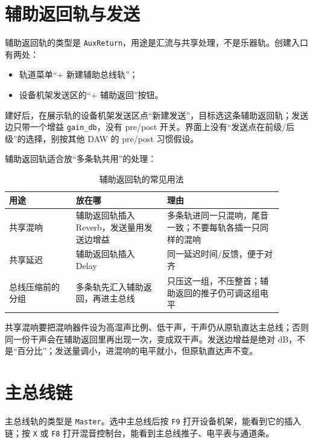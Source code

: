 \section{辅助返回轨与发送}

辅助返回轨的类型是 \texttt{AuxReturn}，用途是汇流与共享处理，不是乐器轨。创建入口有两处：

\begin{itemize}
  \item 轨道菜单“+ 新建辅助总线轨”；
  \item 设备机架发送区的“+ 辅助返回”按钮。
\end{itemize}

建好后，在展示轨的设备机架发送区点“新建发送”，目标选这条辅助返回轨；发送边只带一个增益 \texttt{gain\_db}，没有 pre/post 开关。界面上没有“发送点在前级/后级”的选择，别按其他 DAW 的 pre/post 习惯假设。


辅助返回轨适合放“多条轨共用”的处理：

\begin{table}[htbp]
\centering
\small
\begin{tabular}{@{}p{0.22\linewidth}p{0.30\linewidth}p{0.38\linewidth}@{}}
\hline
用途 & 放在哪 & 理由 \\
\hline
共享混响 & 辅助返回轨插入 Reverb，发送量用发送边增益 & 多条轨进同一只混响，尾音一致；不要每轨各插一只同样的混响 \\
共享延迟 & 辅助返回轨插入 Delay & 同一延迟时间/反馈，便于对齐 \\
总线压缩前的分组 & 多条轨先汇入辅助返回，再进主总线 & 只压这一组，不压整首；辅助返回的推子仍可调这组电平 \\
\hline
\end{tabular}
\caption{辅助返回轨的常见用法}
\label{tab:aux-return-uses}
\end{table}

共享混响要把混响器件设为高湿声比例、低干声，干声仍从原轨直达主总线；否则同一份干声会在辅助返回里再出现一次，变成双干声。发送边增益是绝对 dB，不是“百分比”；发送量调小，进混响的电平就小，但原轨直达声不变。

\section{主总线链}

主总线轨的类型是 \texttt{Master}。选中主总线后按 \texttt{F9} 打开设备机架，能看到它的插入链；按 \texttt{X} 或 \texttt{F8} 打开混音控制台，能看到主总线推子、电平表与通道条。

